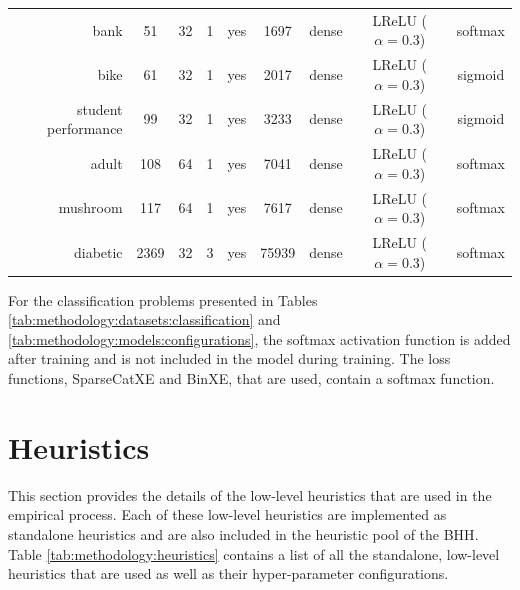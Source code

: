 \begin{table}[htb]
{\begin{tabular}{rcccccccc}
                  bank                & 51              & 32              & 1               & yes             & 1697                & dense             & LReLU ($\alpha = 0.3$) & softmax                \\
                  bike                & 61              & 32              & 1               & yes             & 2017                & dense             & LReLU ($\alpha = 0.3$) & sigmoid                \\
                  student performance & 99              & 32              & 1               & yes             & 3233                & dense             & LReLU ($\alpha = 0.3$) & sigmoid                \\
                  adult               & 108             & 64              & 1               & yes             & 7041                & dense             & LReLU ($\alpha = 0.3$) & softmax                \\
                  mushroom            & 117             & 64              & 1               & yes             & 7617                & dense             & LReLU ($\alpha = 0.3$) & softmax                \\
                  diabetic            & 2369            & 32              & 3               & yes             & 75939               & dense             & LReLU ($\alpha = 0.3$) & softmax                \\
            \end{tabular}%
      }
\end{table}%

For the classification problems presented in Tables \ref{tab:methodology:datasets:classification} and \ref{tab:methodology:models:configurations}, the softmax activation function is added after training and is not included in the model during training. The loss functions, \acf{SparseCatXE} and \acf{BinXE}, that are used, contain a softmax function.

\section{Heuristics}\label{sec:methodology:heuristics}

This section provides the details of the low-level heuristics that are used in the empirical process. Each of these low-level heuristics are implemented as standalone heuristics and are also included in the heuristic pool of the \acs{BHH}. Table \ref{tab:methodology:heuristics} contains a list of all the standalone, low-level heuristics that are used as well as their hyper-parameter configurations.

